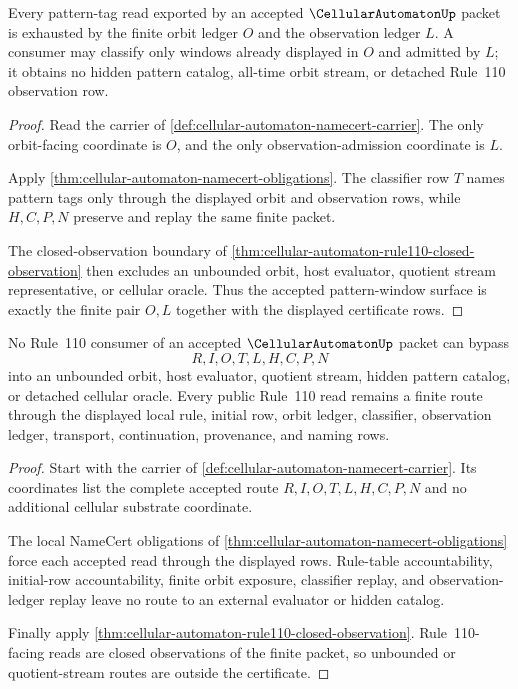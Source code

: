 \begin{theorem}
\label{thm:cellular-automaton-accepted-window-exhaustion}
Every pattern-tag read exported by an accepted $\CellularAutomatonUp$ packet is exhausted by the finite orbit ledger $O$ and the observation ledger $L$. A consumer may classify only windows already displayed in $O$ and admitted by $L$; it obtains no hidden pattern catalog, all-time orbit stream, or detached Rule~110 observation row.
\end{theorem}
\begin{proof}
Read the carrier of \autoref{def:cellular-automaton-namecert-carrier}. The only orbit-facing coordinate is $O$, and the only observation-admission coordinate is $L$.

Apply \autoref{thm:cellular-automaton-namecert-obligations}. The classifier row $T$ names pattern tags only through the displayed orbit and observation rows, while $H,C,P,N$ preserve and replay the same finite packet.

The closed-observation boundary of \autoref{thm:cellular-automaton-rule110-closed-observation} then excludes an unbounded orbit, host evaluator, quotient stream representative, or cellular oracle. Thus the accepted pattern-window surface is exactly the finite pair $O,L$ together with the displayed certificate rows.
\end{proof}

\begin{theorem}
\label{thm:cellular-automaton-finite-route-nonescape}
No Rule~110 consumer of an accepted $\CellularAutomatonUp$ packet can bypass
$$
R,I,O,T,L,H,C,P,N
$$
into an unbounded orbit, host evaluator, quotient stream, hidden pattern catalog, or detached cellular oracle. Every public Rule~110 read remains a finite route through the displayed local rule, initial row, orbit ledger, classifier, observation ledger, transport, continuation, provenance, and naming rows.
\end{theorem}
\begin{proof}
Start with the carrier of \autoref{def:cellular-automaton-namecert-carrier}. Its coordinates list the complete accepted route $R,I,O,T,L,H,C,P,N$ and no additional cellular substrate coordinate.

The local NameCert obligations of \autoref{thm:cellular-automaton-namecert-obligations} force each accepted read through the displayed rows. Rule-table accountability, initial-row accountability, finite orbit exposure, classifier replay, and observation-ledger replay leave no route to an external evaluator or hidden catalog.

Finally apply \autoref{thm:cellular-automaton-rule110-closed-observation}. Rule~110-facing reads are closed observations of the finite packet, so unbounded or quotient-stream routes are outside the certificate.
\end{proof}

